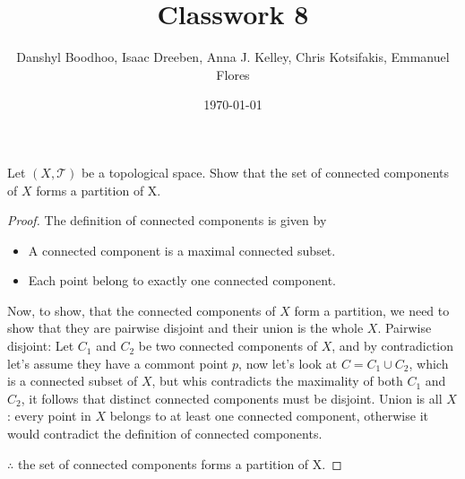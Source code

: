 \documentclass[oneside,english]{amsart}
\numberwithin{equation}{section}
\numberwithin{figure}{section}
\begin{document}
\title{Classwork 8}
\date{\today}
\author{Danshyl Boodhoo, Isaac Dreeben, Anna J. Kelley, Chris Kotsifakis, Emmanuel Flores}

\maketitle
Let $(X, \mathcal{T})$ be a topological space. Show that the set of connected components of $X$ forms a partition of X.
\begin{proof}
The definition of connected components is given by
\begin{itemize}
	\item A connected component is a maximal connected subset.
	\item Each point belong to exactly one connected component.
\end{itemize}
Now, to show, that the connected components of $X$ form a partition, we need to show that they are pairwise disjoint and their union is the whole $X$. 
Pairwise disjoint: Let $C_{1}$ and $C_{2}$ be two connected components of $X$, and by contradiction let's assume they have a commont point $p$, now let's look at $C = C_1 \cup C_2$, which is a connected subset of $X$, but whis contradicts the maximality of both $C_{1}$ and $C_{2}$, it follows that distinct connected components must be disjoint.
Union is all $X$: every point in $X$ belongs to at least one connected component, otherwise it would contradict the definition of connected components.

$\therefore$ the set of connected components forms a partition of X.
\end{proof}
\end{document}
